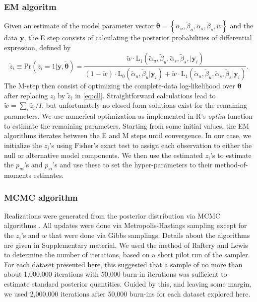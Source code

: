 \documentclass[11pt]{article}
\begin{document}
\subsubsection{EM algoritm}
Given an estimate of the model parameter vector $\tilde{\boldsymbol{\theta}}=\left\{\tilde{\alpha}_u,\tilde{\beta}_u,\tilde{\alpha}_s,\tilde{\beta}_s,\tilde{w}\right\}$ and the data $\mathbf{y}$, the E step consists of calculating the posterior probabilities of differential expression, defined by
\[
\tilde z_{i} \equiv \mathrm{Pr}(z_i=1|\mathbf{y},\tilde{\boldsymbol{\theta}})=\frac{\tilde{w} \cdot \mathrm{L}_1(\tilde{\alpha}_u,\tilde{\beta}_u,\tilde{\alpha}_s,\tilde{\beta}_s,|\mathbf{y}_i)}{(1-\tilde{w})\cdot\mathrm{L}_0(\tilde{\alpha}_u,\tilde{\beta}_u|\mathbf{y}_i)+\tilde{w}\cdot\mathrm{L}_1(\tilde{\alpha}_u,\tilde{\beta}_u,\tilde{\alpha}_s,\tilde{\beta}_s|\mathbf{y}_i)}.
\] 
The M-step then consist of optimizing the complete-data log-likelihood over $\boldsymbol{\theta}$ after replacing $z_i$ by $\tilde{z}_{i}$ in \eqref{eq:cll}. Straightforward calculations lead to 
$\tilde w = \sum_i{\tilde{z_i}}/I$, but unfortunately no closed form solutions exist for the remaining parameters. We use numerical optimization as implemented in R's \textit{optim} function to estimate the remaining parameters.  Starting from some initial values, the EM algorithms iterates between the E and M steps until convergence. In our case, we initialize the $z_{i}$'s using Fisher's exact test to assign each observation to either the null or alternative model components. We then use the estimated $z_i$'s to estimate the $p_{ui}$'s and $p_{si}$'s and use these to set the hyper-parameters to their method-of-moments estimates.

\subsubsection{MCMC algorithm}
Realizations were generated from the posterior distribution via MCMC algorithms \citep{Gelfand:1996wc}. All updates were done via Metropolis-Hastings sampling except for the $z_i$'s and $w$ that were done via Gibbs samplings.
Details about the algorithms are given in Supplementary material. We used the method of Raftery and Lewis \citep{Raftery:1992vp,Raftery:1996ws} to determine the number of iterations, based on a short pilot run of the sampler. For each dataset presented here, this suggested that a sample of no more than about 1,000,000 iterations with 50,000 burn-in iterations was sufficient to estimate standard posterior quantities. Guided by this, and leaving some margin, we used 2,000,000 iterations after 50,000  burn-ins for each dataset explored here. 
\end{document}
